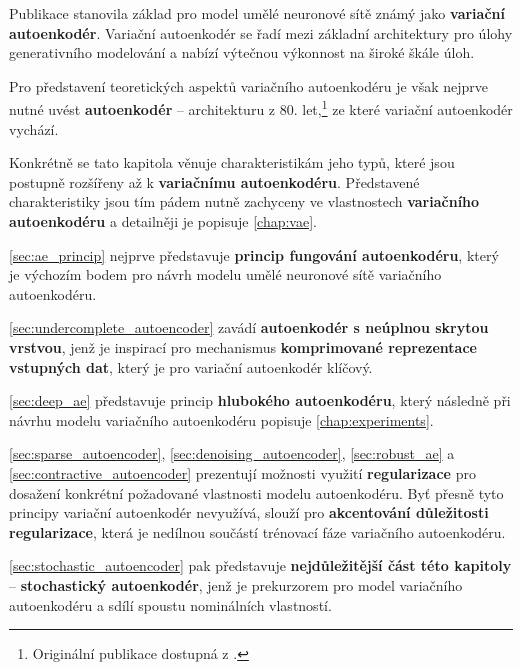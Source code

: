 Publikace \textcite{Kingma2014} stanovila základ pro model umělé neuronové sítě známý jako \textbf{variační autoenkodér}.
Variační autoenkodér se řadí mezi základní architektury pro úlohy generativního modelování a nabízí výtečnou výkonnost na široké škále úloh. \cite{Kingma2014, Kingma2019}

Pro představení teoretických aspektů variačního autoenkodéru je však nejprve nutné uvést \textbf{autoenkodér} – architekturu z 80. let,\footnote{Originální publikace dostupná z \textcite{Rumelhart1987}.} ze které variační autoenkodér vychází.

Konkrétně se tato kapitola věnuje charakteristikám jeho typů, které jsou postupně rozšířeny až k \textbf{variačnímu autoenkodéru}.
Představené charakteristiky jsou tím pádem nutně zachyceny ve vlastnostech \textbf{variačního autoenkodéru} a detailněji je popisuje \autoref{chap:vae}.

\autoref{sec:ae_princip} nejprve představuje \textbf{princip fungování autoenkodéru}, který je výchozím bodem pro návrh modelu umělé neuronové sítě variačního autoenkodéru.

\autoref{sec:undercomplete_autoencoder} zavádí \textbf{autoenkodér s neúplnou skrytou vrstvou}, jenž je inspirací pro mechanismus \textbf{komprimované reprezentace vstupných dat}, který je pro variační autoenkodér klíčový.

\autoref{sec:deep_ae} představuje princip \textbf{hlubokého autoenkodéru}, který následně při návrhu modelu variačního autoenkodéru popisuje \autoref{chap:experiments}.

\autoref{sec:sparse_autoencoder}, \autoref{sec:denoising_autoencoder}, \autoref{sec:robust_ae} a \autoref{sec:contractive_autoencoder} prezentují možnosti využití \textbf{regularizace} pro dosažení konkrétní požadované vlastnosti modelu autoenkodéru.
Byť přesně tyto principy variační autoenkodér nevyužívá, slouží pro \textbf{akcentování důležitosti regularizace}, která je nedílnou součástí trénovací fáze variačního autoenkodéru.

\autoref{sec:stochastic_autoencoder} pak představuje \textbf{nejdůležitější část této kapitoly} – \textbf{stochastický autoenkodér}, jenž je prekurzorem pro model variačního autoenkodéru a sdílí spoustu nominálních vlastností.
\newpage